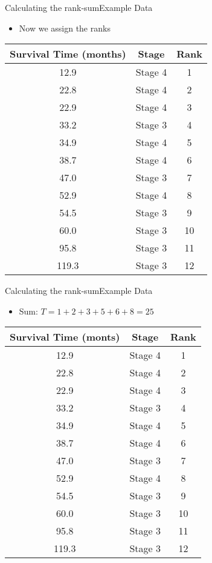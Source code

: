 \documentclass[xcolor=dvipsnames]{beamer}
\begin{document}
\begin{frame}{Calculating the rank-sum}{Example Data}
\begin{itemize}
	\item Now we assign the ranks
\end{itemize}
\begin{center}
	\begin{tabular}{|c|c|c|}
		\hline
		\textbf{Survival Time (months)} &  \textbf{Stage} & \textbf{Rank}\\ \hline \hline
		12.9 &Stage 4 & 1 \\ \hline
		22.8 &Stage 4 & 2\\ \hline
		22.9& Stage 4 & 3\\ \hline
		33.2 &Stage 3 & 4\\ \hline
		34.9& Stage 4 & 5\\ \hline
		38.7 &Stage 4 & 6\\ \hline
		47.0 &Stage 3 & 7\\ \hline		
		52.9  &Stage 4 & 8\\ \hline
		54.5 &Stage 3 & 9\\ \hline				
		60.0 &Stage 3 & 10\\ \hline
		95.8& Stage 3 & 11\\ \hline
		119.3 &Stage 3 & 12\\ \hline
	\end{tabular}
\end{center}
\end{frame}

\begin{frame}{Calculating the rank-sum}{Example Data}
\begin{itemize}
	\item Sum: $T = 1 + 2 + 3 + 5 + 6 + 8 = 25$
\end{itemize}
\begin{center}
	\begin{tabular}{|c|c|c|}
		\hline
		\textbf{Survival Time (monts)} &  \textbf{Stage} & \textbf{Rank}\\ \hline \hline
		12.9 &Stage 4 & 1 \\ \hline
		22.8 &Stage 4 & 2\\ \hline
		22.9& Stage 4 & 3\\ \hline
		33.2 &Stage 3 & 4\\ \hline
		34.9& Stage 4 & 5\\ \hline
		38.7 &Stage 4 & 6\\ \hline
		47.0 &Stage 3 & 7\\ \hline		
		52.9  &Stage 4 & 8\\ \hline
		54.5 &Stage 3 & 9\\ \hline				
		60.0 &Stage 3 & 10\\ \hline
		95.8& Stage 3 & 11\\ \hline
		119.3 &Stage 3 & 12\\ \hline
	\end{tabular}
\end{center}
\end{frame}
\end{document}
